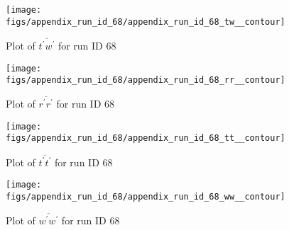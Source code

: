 \begin{figure}[H]
\centering
\texttt{[image: figs/appendix\_run\_id\_68/appendix\_run\_id\_68\_tw\_\_contour]}
\caption{Plot of $\overline{t^\prime w^\prime}$ for run ID 68}
\label{fig:appendix_run_id_68_tw__contour}
\end{figure}


\begin{figure}[H]
\centering
\texttt{[image: figs/appendix\_run\_id\_68/appendix\_run\_id\_68\_rr\_\_contour]}
\caption{Plot of $\overline{r^\prime r^\prime}$ for run ID 68}
\label{fig:appendix_run_id_68_rr__contour}
\end{figure}


\begin{figure}[H]
\centering
\texttt{[image: figs/appendix\_run\_id\_68/appendix\_run\_id\_68\_tt\_\_contour]}
\caption{Plot of $\overline{t^\prime t^\prime}$ for run ID 68}
\label{fig:appendix_run_id_68_tt__contour}
\end{figure}


\begin{figure}[H]
\centering
\texttt{[image: figs/appendix\_run\_id\_68/appendix\_run\_id\_68\_ww\_\_contour]}
\caption{Plot of $\overline{w^\prime w^\prime}$ for run ID 68}
\label{fig:appendix_run_id_68_ww__contour}
\end{figure}


